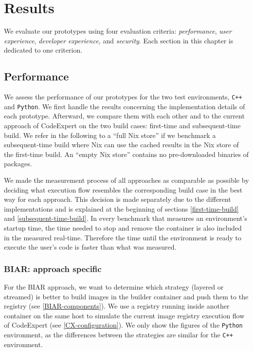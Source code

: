 \chapter{Results}\label{results}
We evaluate our prototypes using four evaluation criteria: \emph{performance}, \emph{user experience}, \emph{developer experience,} and \emph{security}. Each section in this chapter is dedicated to one criterion.
\section{Performance}\label{results:performance}
We assess the performance of our prototypes for the two test environments, \verb|C++| and \verb|Python|. We first handle the results concerning the implementation details of each prototype. Afterward, we compare them with each other and to the current approach of CodeExpert on the two build cases: first-time and subsequent-time build. We refer in the following to a ``full Nix store'' if we benchmark a subsequent-time build where Nix can use the cached results in the Nix store of the first-time build. An ``empty Nix store'' contains no pre-downloaded binaries of packages.

We made the measurement process of all approaches as comparable as possible by deciding what execution flow resembles the corresponding build case in the best way for each approach. This decision is made separately due to the different implementations and is explained at the beginning of sections \ref{first-time-build} and \ref{subsequent-time-build}. In every benchmark that measures an environment's startup time, the time needed to stop and remove the container is also included in the measured real-time. Therefore the time until the environment is ready to execute the user's code is faster than what was measured.

\subsection{BIAR: approach specific}\label{biar-approach-specific}
For the BIAR approach, we want to determine which strategy (layered or streamed) is better to build images in the builder container and push them to the registry (see \ref{BIAR-components}). We use a registry running inside another container on the same host to simulate the current image registry execution flow of CodeExpert (see \ref{CX-configuration}). We only show the figures of the \verb|Python| environment, as the differences between the strategies are similar for the \verb|C++| environment.

